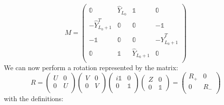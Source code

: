 \begin{equation}
    M = \begin{pmatrix}
        \mathbb{0} & \hat{Y}_{L_0} & \mathbb{1} & \mathbb{0} \\
        - \hat{Y}_{L_0 + 1}^{T} & \mathbb{0} & \mathbb{0} & -\mathbb{1} \\
         -\mathbb{1} & \mathbb{0} & \mathbb{0} & - \hat{Y}_{L_0 + 1}^{T} \\
         \mathbb{0} & \mathbb{1} & \hat{Y}_{L_0 + 1} & \mathbb{0} \\
    \end{pmatrix}
\end{equation}
We can now perform a rotation represented by the matrix:
\begin{equation}
    R = \begin{pmatrix}
        U & 0 \\
        0 & U \\
    \end{pmatrix} \begin{pmatrix}
        V & 0 \\
        0 & V \\
    \end{pmatrix} \begin{pmatrix}
        i\mathbb{1} & 0 \\
        0 & \mathbb{1} \\
    \end{pmatrix} \begin{pmatrix}
        Z & 0 \\
        0 & \mathbb{1}
    \end{pmatrix} = \begin{pmatrix}
        R_+ & 0 \\
        0 & R_- \\
    \end{pmatrix}
\end{equation}
with the definitions:
